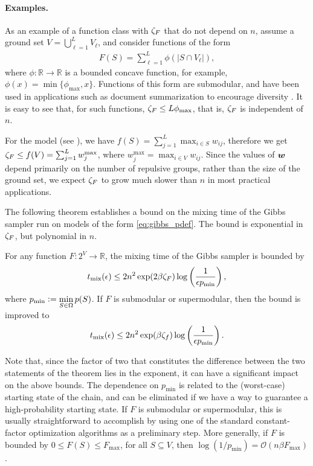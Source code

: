 \paragraph{Examples.}
As an example of a function class with $\zeta_F$ that do not depend on $n$, assume a ground set $V = \bigcup_{\ell = 1}^L V_{\ell}$, and consider functions of the form
\begin{align*}
F(S) = \sum_{\ell = 1}^L \phi(|S \cap V_{\ell}|),
\end{align*}
where $\phi : \mathbb{R} \to \mathbb{R}$ is a bounded concave function, for example, $\phi(x) = \min\{\phi_{\max}, x\}$.
Functions of this form are submodular, and have been used in applications such as document summarization to encourage diversity \citep{lin11}.
It is easy to see that, for such functions, $\zeta_F \leq L\phi_{\max}$, that is, $\zeta_F$ is independent of $n$.

For the \flid{} model (see ), we have $f(S) = \sum_{j=1}^L \max_{i \in S} w_{ij}$, therefore we get $\zeta_F \leq f(V) = \sum_{j=1}^L w_j^{\mathrm{max}}$, where $w_j^{\mathrm{max}} = \max_{i \in V} w_{ij}$.
Since the values of $\bm{w}$ depend primarily on the number of repulsive groups, rather than the size of the ground set, we expect $\zeta_F$ to grow much slower than $n$ in most practical applications.

\vspace{1.5em}
\noindent The following theorem establishes a bound on the mixing time of the Gibbs sampler run on models of the form \eqref{eq:gibbs_pdef}.
The bound is exponential in $\zeta_F$, but polynomial in $n$.
\begin{theorem} \label{thm:poly}
  For any function $F : 2^V \to \mathbb{R}$, the mixing time of the Gibbs sampler is bounded by
  \begin{align*}
    t_{\mathrm{mix}}(\epsilon) \leq 2n^2 \exp(2 \beta \zeta_F) \log\left(\frac{1}{\epsilon p_{\min}}\right),
  \end{align*}
  where $p_{\min} \vcentcolon= \displaystyle\min_{S \in \Omega}p(S)$.
  If $F$ is submodular or supermodular, then the bound is improved to
  \begin{align*}
    t_{\mathrm{mix}}(\epsilon) \leq 2n^2 \exp(\beta \zeta_f) \log\left(\frac{1}{\epsilon p_{\min}}\right).
  \end{align*}
\end{theorem}
Note that, since the factor of two that constitutes the difference between the two statements of the theorem lies in the exponent, it can have a significant impact on the above bounds.
The dependence on $p_{\min}$ is related to the (worst-case) starting state of the chain, and can be eliminated if we have a way to guarantee a high-probability starting state.
If $F$ is submodular or supermodular, this is usually straightforward to accomplish by using one of the standard constant-factor optimization algorithms \citep{nemhauser78,fujishige05} as a preliminary step.
More generally, if $F$ is bounded by $0 \leq F(S) \leq F_{\max}$, for all $S \subseteq V$, then $\log (1/p_{\min}) = \mathcal{O}(n \beta F_{\max})$.

